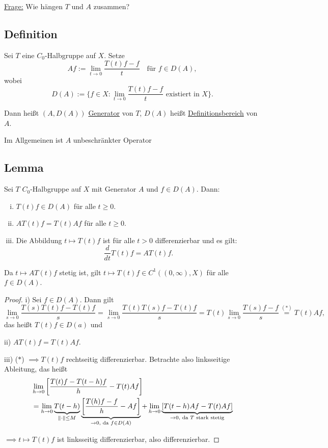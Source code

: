 \underline{Frage:} Wie hängen $T$ und $A$ zusammen?

\subsection{Definition}

Sei $T$ eine $C_0$-Halbgruppe auf $X$. Setze
$$
Af := \lim_{t \to 0} \frac{T(t) f - f}{t} \quad\text{für } f \in D(A),
$$
wobei
$$
D(A) := \{ f \in X \colon \lim_{t \to 0} \frac{T(t) f - f}{t} \text{ existiert in } X\}.
$$

Dann heißt $(A, D(A))$ \underline{Generator} von $T$, $D(A)$ heißt \underline{Definitionsbereich} von $A$.

\begin{bem}
  Im Allgemeinen ist $A$ unbeschränkter Operator
\end{bem}

\subsection{Lemma}

Sei $T$ $C_0$-Halbgruppe auf $X$ mit Generator $A$ und $f \in D(A)$. Dann:
\begin{enumerate}[i)]
  \item $T(t) f \in D(A)$ für alle $t \geq 0$.
  \item $AT(t) f = T(t) A f$ für alle $t \geq 0$.
  \item Die Abbildung $t \mapsto T(t) f $ ist für alle $t > 0$ differenzierbar und es gilt:
  $$
    \frac{d}{dt} T(t) f = A T(t) f.
  $$
\end{enumerate}

\begin{bem}
  Da $t \mapsto AT(t) f$ stetig ist, gilt $t \mapsto T(t) f \in C^1((0,\infty), X)$ für alle $f \in D(A)$.
\end{bem}

\begin{proof}
i) Sei $f \in D(A)$. Dann gilt
$$
\lim_{s \to 0} \frac{T(s)T(t) f - T(t) f}{s} = \lim_{s \to 0} \frac{T(t)T(s) f - T(t) f}{s} = T(t) \lim_{s \to 0} \frac{T(s)f - f}{s} \overset{(\ast)}{=} T(t)A f,
$$
das heißt $T(t) f \in D(a)$ und

ii) $AT(t) f = T(t) Af$.

iii) ($\ast$) $\implies T(t) f$ rechtseitig differenzierbar. Betrachte also linksseitige Ableitung, das heißt
\begin{align*}
&\lim_{h \to 0} \left[\frac{T(t)f - T(t - h)f}{h} - T(t) Af \right] \\
&= \lim_{h \to 0} \underbrace{T(t - h)}_{\lVert \cdot \rVert \leq M} \underbrace{\left[\frac{T(h) f - f}{h} - Af \right]}_{\to 0, \text{ da } f \in D(A)} 
+ \lim_{h \to 0} \underbrace{\left[ T(t - h) Af - T(t) Af \right]}_{\to 0, \text{ da } T \text{ stark stetig}}
\end{align*}

$\implies t \mapsto T(t) f$ ist linksseitig differenzierbar, also differenzierbar.
\end{proof}

